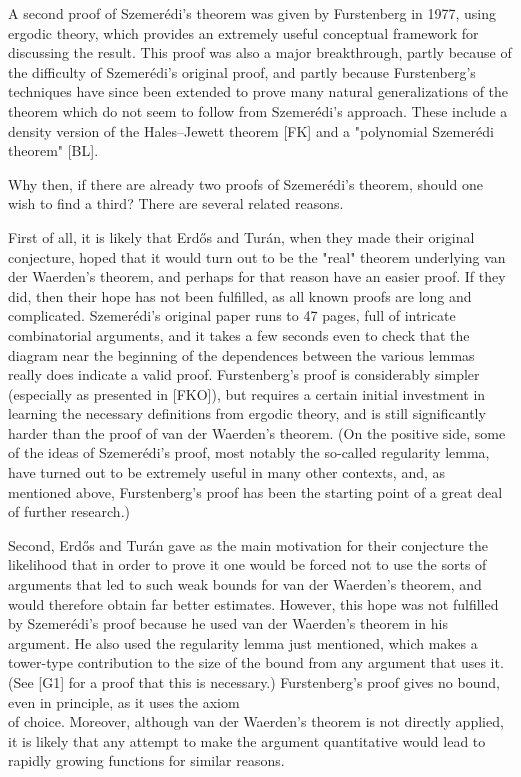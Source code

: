 \documentclass[10pt]{article}
\begin{document}
A second proof of Szemerédi's theorem was given by Furstenberg in 1977, using ergodic theory, which provides an extremely useful conceptual framework for discussing the result. This proof was also a major breakthrough, partly because of the difficulty of Szemerédi's original proof, and partly because Furstenberg's techniques have since been extended to prove many natural generalizations of the theorem which do not seem to follow from Szemerédi's approach. These include a density version of the Hales--Jewett theorem [FK] and a "polynomial Szemerédi theorem" [BL].

Why then, if there are already two proofs of Szemerédi's theorem, should one wish to find a third? There are several related reasons.

First of all, it is likely that Erdős and Turán, when they made their original conjecture, hoped that it would turn out to be the "real" theorem underlying van der Waerden's theorem, and perhaps for that reason have an easier proof. If they did, then their hope has not been fulfilled, as all known proofs are long and complicated. Szemerédi's original paper runs to 47 pages, full of intricate combinatorial arguments, and it takes a few seconds even to check that the diagram near the beginning of the dependences between the various lemmas really does indicate a valid proof. Furstenberg's proof is considerably simpler (especially as presented in [FKO]), but requires a certain initial investment in learning the necessary definitions from ergodic theory, and is still significantly harder than the proof of van der Waerden's theorem. (On the positive side, some of the ideas of Szemerédi's proof, most notably the so-called regularity lemma, have turned out to be extremely useful in many other contexts, and, as mentioned above, Furstenberg's proof has been the starting point of a great deal of further research.)

Second, Erdős and Turán gave as the main motivation for their conjecture the likelihood that in order to prove it one would be forced not to use the sorts of arguments that led to such weak bounds for van der Waerden's theorem, and would therefore obtain far better estimates. However, this hope was not fulfilled by Szemerédi's proof because he used van der Waerden's theorem in his argument. He also used the regularity lemma just mentioned, which makes a tower-type contribution to the size of the bound from any argument that uses it. (See [G1] for a proof that this is necessary.) Furstenberg's proof gives no bound, even in principle, as it uses the axiom\\
of choice. Moreover, although van der Waerden's theorem is not directly applied, it is likely that any attempt to make the argument quantitative would lead to rapidly growing functions for similar reasons.
\end{document}
